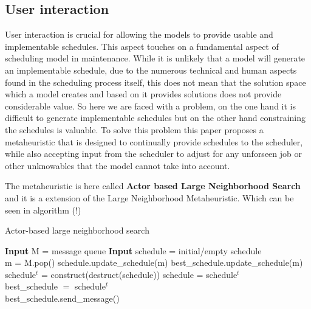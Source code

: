 \documentclass[runningheads]{llncs}
\begin{document}
\subsection{User interaction}
User interaction is crucial for allowing the models to provide usable and implementable schedules. This aspect touches 
on a fundamental aspect of scheduling model in maintenance. While it is unlikely that a model will generate
an implementable schedule, due to the numerous technical and human aspects found in the scheduling process
itself, this does not mean that the solution space which a model creates and based on it provides solutions does not 
provide considerable value. So here we are faced with a problem, on the one hand it is difficult to generate implementable
schedules but on the other hand constraining the schedules is valuable. To solve this problem this paper proposes
a metaheuristic that is designed to continually provide schedules to the scheduler, while also accepting input from the scheduler
to adjust for any unforseen job or other unknowables that the model cannot take into account.

The metaheuristic is here called \textbf{Actor based Large Neighborhood Search} and it is a extension of the 
Large Neighborhood Metaheuristic. Which can be seen in algorithm (!) 



\begin{algorithm}[H]
\caption{Actor-based large neighborhood search}\label{algo1}
\begin{algorithmic}[1]
\State \textbf{Input} M = message queue
\State \textbf{Input} schedule = initial/empty schedule
    \\
        \State m = M.pop()
        \State schedule.update\_schedule(m)
        \State best\_schedule.update\_schedule(m)
    \EndWhile
    \\
    \State schedule$^t$ = construct(destruct(schedule))
     \label{alg:acceptance_criteria_start}
        \State schedule = schedule$^t$
    \EndIf \label{alg:acceptance_criteria_end}
    \\
    \label{alg:objective_start}
        \State best\_schedule $=$ schedule$^t$
    \EndIf \label{alg:objective_end}
    \\
     \label{alg:state_change_start}
        \State best\_schedule.send\_message()
    \EndIf \label{alg:state_change_end}
\EndWhile
\end{algorithmic}
\end{algorithm}
\end{document}
